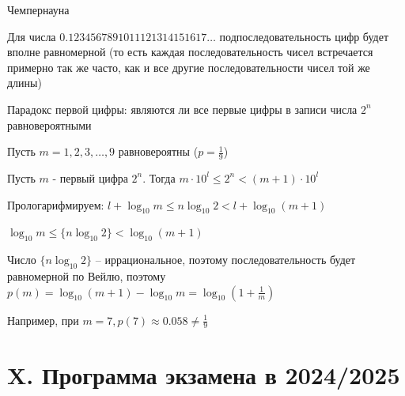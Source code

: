 \documentclass[12pt]{article}
\begin{document}
\begin{MyTheorem}
    \Ths Чемпернауна

    Для числа $0.1234567891011121314151617\dots$ подпоследовательность цифр будет вполне равномерной (то есть каждая последовательность чисел встречается примерно так же часто, как и все другие последовательности чисел той же длины)
\end{MyTheorem}

Парадокс первой цифры: являются ли все первые цифры в записи числа $2^n$ равновероятными

Пусть $m = 1, 2, 3, \dots, 9$ равновероятны ($p = \frac{1}{9}$)

Пусть $m$ - первый цифра $2^n$. Тогда $m \cdot 10^l \leq 2^n < (m + 1) \cdot 10^l$

Прологарифмируем: $l + \log_{10} m \leq n \log_{10} 2 < l + \log_{10} (m + 1)$

$\log_{10} m \leq \{n \log_{10} 2\} < \log_{10} (m + 1)$

Число $\{n \log_{10} 2\}$ -- иррациональное, поэтому последовательность будет равномерной по Вейлю, поэтому $p(m) = \log_{10} (m + 1) - \log_{10} m = \log_{10} \left(1 + \frac{1}{m}\right)$

Например, при $m = 7, p(7) \approx 0.058 \neq \frac{1}{9}$

\clearpage

\section{X. Программа экзамена в 2024/2025}
\end{document}

